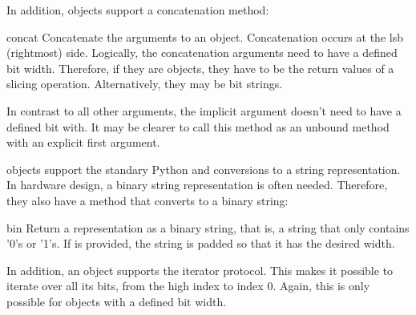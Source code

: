 In addition,  objects support a concatenation method:

\begin{methoddesc}[intbv]{concat}{}
Concatenate the arguments to an  object. Concatenation
occurs at the lsb (rightmost) side. Logically, the concatenation
arguments need to have a defined bit width. Therefore, if they are
 objects, they have to be the return values of a slicing
operation. Alternatively, they may be bit strings.

In contrast to all other arguments, the implicit  argument
doesn't need to have a defined bit with.  It may be clearer to call
this method as an unbound method with an explicit first 
argument.
\end{methoddesc}

 objects support the standary Python  and
 conversions to a string representation. In hardware design, a
binary string representation is often needed. Therefore, they also
have a method that converts to a binary string:

\begin{methoddesc}[intbv]{bin}{}
Return a representation as a binary string, that is, a string that
only contains '0's or '1's. If  is provided, the string is
padded so that it has the desired width.
\end{methoddesc}

In addition, an  object supports the iterator protocol. This
makes it possible to iterate over all its bits, from the high index to
index 0. Again, this is only possible for  objects with a
defined bit width.











